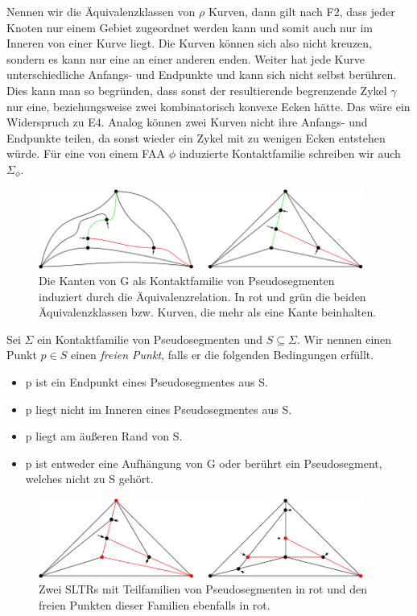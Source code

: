 Nennen wir die Äquivalenzklassen von $\rho$ Kurven, dann gilt nach F2, dass jeder Knoten nur einem Gebiet zugeordnet werden kann und somit auch nur im Inneren von einer Kurve liegt. Die Kurven können sich also nicht kreuzen, sondern es kann nur eine an einer anderen enden. Weiter hat jede Kurve unterschiedliche Anfangs- und Endpunkte und kann sich nicht selbst berühren. Dies kann man so begründen, dass sonst der resultierende begrenzende Zykel $\gamma$ nur eine, beziehungsweise zwei kombinatorisch konvexe Ecken hätte. Das wäre ein Widerspruch zu E4. Analog können zwei Kurven nicht ihre Anfangs- und Endpunkte teilen, da sonst wieder ein Zykel mit zu wenigen Ecken entstehen würde. Für eine von einem FAA $\phi$ induzierte Kontaktfamilie schreiben wir auch $\Sigma_{\phi}$. 

\begin{figure}[h]
	\centering
  \includegraphics[width=0.95\textwidth]{pseudo_seg.png}
  \caption{Die Kanten von G als Kontaktfamilie von Pseudosegmenten induziert durch die Äquivalenzrelation. In rot und grün die beiden Äquivalenzklassen bzw. Kurven, die mehr als eine Kante beinhalten.}
\end{figure}

\begin{definition}
Sei $\Sigma$ ein Kontaktfamilie von Pseudosegmenten und $S\subseteq\Sigma$. Wir nennen einen Punkt $p\in S$ einen \textit{freien Punkt}, falls er die folgenden Bedingungen erfüllt.
\begin{itemize}
\item p ist ein Endpunkt eines Pseudosegmentes aus S.
\item p liegt nicht im Inneren eines Pseudosegmentes aus S.
\item p liegt am äußeren Rand von S.
\item p ist entweder eine Aufhängung von G oder berührt ein Pseudosegment, welches nicht zu S gehört.
\end{itemize} 
\end{definition}

\begin{figure}[h]
	\centering
  \includegraphics[width=0.95\textwidth]{exp_free.png}
  \caption{Zwei SLTRs mit Teilfamilien von Pseudosegmenten in rot und den freien Punkten dieser Familien ebenfalls in rot.}
\end{figure}

